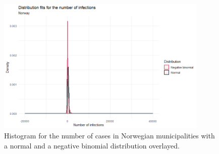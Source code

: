 \clearpage
\begin{figure}[H]
  \centering
  \includegraphics[width = 0.9\textwidth]{distrfit_norway_ts.png}
  \caption{Histogram for the number of cases in Norwegian municipalities with a normal and a negative binomial distribution overlayed.}
  \label{fitDistrNorway_ts}
\end{figure}
\clearpage
